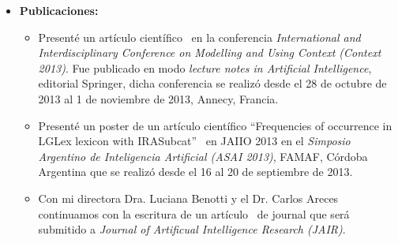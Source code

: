 \begin{itemize}
\begin{itemize}
\item En la presentaci\'on que realic\'e en Annecy Francia conoci varios investigadores del \'area los cuales se mostraron interesados en mi trabajo Dra. Roberts Craige de Ohio	State	University, Dr. Stone Matthew, Rutgers, USA.
\end{itemize}
\item \textbf{Publicaciones:} 
\begin{itemize}
\item Present\'e un art\'iculo cient\'ifico~\cite{benotti-altamirano-context2013} en la conferencia \emph{International and Interdisciplinary Conference on Modelling and Using Context (Context 2013)}. Fue publicado en modo \emph{lecture notes in Artificial Intelligence}, editorial Springer, dicha conferencia se realiz\'o desde el 28 de octubre de 2013 al 1 de noviembre de 2013, Annecy, Francia.
\item Present\'e un poster de un art\'iculo cient\'ifico ``Frequencies of occurrence in LGLex lexicon with IRASubcat''~ \cite{tolone-altamirano} en JAIIO 2013 en el \emph{Simposio Argentino de Inteligencia Artificial (ASAI 2013)}, FAMAF, C\'ordoba Argentina que se realiz\'o desde el 16 al 20 de septiembre de 2013.
\item Con mi directora Dra. Luciana Benotti y el Dr. Carlos Areces continuamos con la escritura de un art\'iculo~\cite{benotti-altamirano-jair} de journal que ser\'a submitido a \emph{Journal of Artificual Intelligence Research (JAIR)}.
\end{itemize}


\end{itemize}
